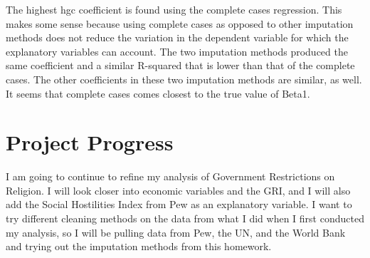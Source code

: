 \documentclass{article}
\begin{document}
The highest hgc coefficient is found using the complete cases regression. This makes some sense because using complete cases as opposed to other imputation methods does not reduce the variation in the dependent variable for which the explanatory variables can account. The two imputation methods produced the same coefficient and a similar R-squared that is lower than that of the complete cases. The other coefficients in these two imputation methods are similar, as well. It seems that complete cases comes closest to the true value of Beta1.

\section{Project Progress}
I am going to continue to refine my analysis of Government Restrictions on Religion. I will look closer into economic variables and the GRI, and I will also add the Social Hostilities Index from Pew as an explanatory variable. I want to try different cleaning methods on the data from what I did when I first conducted my analysis, so I will be pulling data from Pew, the UN, and the World Bank and trying out the imputation methods from this homework.
\end{document}

